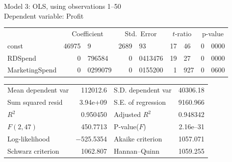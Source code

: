 \documentclass[11pt]{article}
\begin{document}
\thispagestyle{empty}

\begin{center}

Model 3: OLS, using observations 1--50\\
Dependent variable: Profit\\

\vspace{1em}

\begin{tabular}{lr@{.}lr@{.}lr@{.}lr@{.}l}
  &
 \multicolumn{2}{c}{Coefficient} &
  \multicolumn{2}{c}{Std.\ Error} &
   \multicolumn{2}{c}{$t$-ratio} &
    \multicolumn{2}{c}{p-value} \\[1ex]
const &
  46975&9 &
    2689&93 &
      17&46 &
        0&0000 \\
RDSpend &
  0&796584 &
    0&0413476 &
      19&27 &
        0&0000 \\
MarketingSpend &
  0&0299079 &
    0&0155200 &
      1&927 &
        0&0600 \\
\end{tabular}

\vspace{1ex}
\begin{tabular}{lrlr}
Mean dependent var &  112012.6 & S.D. dependent var &  40306.18 \\
Sum squared resid &  3.94\textrm{e+09} & S.E. of regression &  9160.966 \\
$R^2$ &  0.950450 & Adjusted $R^2$ &  0.948342 \\
$F(2, 47)$ &  450.7713 & P-value($F$) &  2.16\textrm{e--31} \\
Log-likelihood & $-$525.5354 & Akaike criterion &  1057.071 \\
Schwarz criterion &  1062.807 & Hannan--Quinn &  1059.255 \\
\end{tabular}


\end{center}
\end{document}
